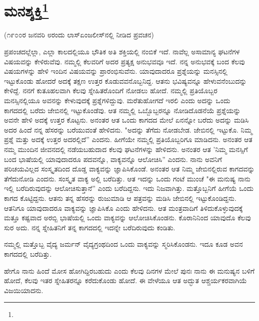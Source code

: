 
\chapter[ಮನಶ್ಶಕ್ತಿ]{ಮನಶ್ಶಕ್ತಿ\protect\footnote{}}

\begin{center}
(೧೯೦೦ರ ಜನವರಿ ೮ರಂದು ಲಾಸ್‌ಏಂಜಲೀಸ್‌ನಲ್ಲಿ ನೀಡಿದ ಪ್ರವಚನ)
\end{center}

ಪ್ರಪಂಚದಲ್ಲೆಲ್ಲಾ, ಎಲ್ಲಾ ಕಾಲದಲ್ಲಿಯೂ ಭೌತಿಕ ಅತಿ ಶಕ್ತಿಯಲ್ಲಿ ನಂಬಿಕೆ ಇದೆ. ನಾವೆಲ್ಲ ಅಸಾಮಾನ್ಯ ಘಟನೆಗಳ ವಿಷಯವನ್ನು ಕೇಳಿರುವೆವು. ನಮ್ಮಲ್ಲಿ ಕೆಲವರಿಗೆ ಅದರ ಪ್ರತ್ಯಕ್ಷ ಅನುಭವವೂ ಇದೆ. ನನ್ನ ಅನುಭವಕ್ಕೆ ಬಂದ ಕೆಲವು ವಿಷಯಗಳನ್ನು ಹೇಳಿ ಇಂದಿನ ವಿಷಯವನ್ನು ಪ್ರಾರಂಭಿಸುವೆನು. ಯಾವುದಾದರೂ ಪ್ರಶ್ನೆಯನ್ನು ಮನಸ್ಸಿನಲ್ಲಿ ಇಟ್ಟುಕೊಂಡು ಹೋದರೆ ಅದಕ್ಕೆ ತಕ್ಷಣ ಉತ್ತರ ಕೊಡುವವನೊಬ್ಬನಿದ್ದ. ಆತನು ಭವಿಷ್ಯವನ್ನೂ ಹೇಳುವನೆಂಬುದನ್ನು ಕೇಳಿದ್ದೆ. ನನಗೆ ಕುತೂಹಲವಾಗಿ ಕೆಲವು ಸ್ನೇಹಿತರೊಂದಿಗೆ ನೋಡಲು ಹೋದೆ. ನಮ್ಮಲ್ಲಿ ಪ್ರತಿಯೊಬ್ಬರ ಮನಸ್ಸಿನಲ್ಲಿಯೂ ಅವನನ್ನು ಕೇಳುವುದಕ್ಕೆ ಪ್ರಶ್ನೆಗಳಿದ್ದುವು. ಮರೆತುಹೋಗದೆ ಇರಲಿ ಎಂದು ಅದನ್ನು ಒಂದು ಕಾಗದದಲ್ಲಿ ಬರೆದು ಜೇಬಿನಲ್ಲಿ ಇಟ್ಟುಕೊಂಡೆವು. ಆತ ನಮ್ಮಲ್ಲಿ ಒಬ್ಬೊಬ್ಬರನ್ನೂ ನೋಡಿದೊಡನೆಯೆ ಪ್ರಶ್ನೆಯನ್ನು ಅವನೇ ಹೇಳಿ ಅದಕ್ಕೆ ಉತ್ತರ ಕೊಟ್ಟನು. ಅನಂತರ ಆತ ಒಂದು ಕಾಗದದ ಮೇಲೆ ಏನನ್ನೋ ಬರೆದು ಅದನ್ನು ಮಡಿಸಿ ಅದರ ಹಿಂದೆ ನನ್ನ ಹೆಸರನ್ನು ಬರೆಯುವಂತೆ ಹೇಳಿದನು. "ಅದನ್ನು ತೆಗೆದು ನೋಡಬೇಡ. ಜೇಬಿನಲ್ಲಿ ಇಟ್ಟುಕೊ. ನಿಮ್ಮ ಪ್ರಶ್ನೆ ಮತ್ತು ಅದಕ್ಕೆ ಉತ್ತರ ಅದರಲ್ಲಿದೆ'' ಎಂದನು. ಹೀಗೆಯೇ ನಮ್ಮಲ್ಲಿ ಪ್ರತಿಯೊಬ್ಬರಿಗೂ ಮಾಡಿದನು. ಅನಂತರ ಆತ ನಮ್ಮ ಮುಂದಿನ ಜೀವನದಲ್ಲಿ ನಡೆಯಬಹುದಾದ ಕೆಲವು ಘಟನೆಗಳನ್ನು ಹೇಳಿದನು. ಅನಂತರ ಆತ 'ನಿಮ್ಮ ಮನಸ್ಸಿಗೆ ಬಂದ ಭಾಷೆಯಲ್ಲಿ ಯಾವುದಾದರೂ ಪದವನ್ನೊ, ವಾಕ್ಯವನ್ನೊ ಆಲೋಚಿಸಿ'' ಎಂದನು. ನಾನು ಅವನಿಗೆ ಪರಿಚಯವಿಲ್ಲದ ಸಂಸ್ಕೃತದಿಂದ ದೊಡ್ಡ ವಾಕ್ಯವನ್ನು ಜ್ಞಾಪಿಸಿಕೊಂಡೆ. ಅನಂತರ ಆತ ನಿಮ್ಮ ಜೇಬಿನಲ್ಲಿರುವ ಕಾಗದವನ್ನು ತೆಗೆದುನೋಡಿ ಎಂದನು. ಸಂಸ್ಕೃತ ವಾಕ್ಯ ಅಲ್ಲಿ ಬರೆದಿತ್ತು. ಆತ ಇದನ್ನು ಒಂದು ಗಂಟೆ ಮುಂಚೆ "ಈ ಮನುಷ್ಯ ನಾನು ಇಲ್ಲಿ ಬರೆದಿರುವುದನ್ನು ಆಲೋಚಿಸುತ್ತಾನೆ'' ಎಂದು ಬರೆದಿದ್ದನು. ಇದು ನಿಜವಾಗಿತ್ತು. ಮತ್ತೊಬ್ಬನಿಗೆ ಹೀಗೆಯೆ ಒಂದು ಕಾಗದ ಕೊಟ್ಟಿದ್ದನು. ಆತನು ತನ್ನ ಹೆಸರನ್ನು ರುಜುಮಾಡಿ ಆ ಪತ್ರವನ್ನು ಮಡಿಸಿ ಜೇಬಿನಲ್ಲಿ ಇಟ್ಟುಕೊಂಡಿದ್ದನು. ಆತನಿಗೂ ಯಾವುದಾದರೂ ವಾಕ್ಯವನ್ನು ಜ್ಞಾಪಿಸಿಕೊ ಎಂದು ಹೇಳಿದನು. ಆತ ಮಂತ್ರವಾದಿಗೆ ತಿಳಿದುಕೊಳ್ಳುವುದಕ್ಕೆ ಮತ್ತೂ ಕಷ್ಟವಾದ ಅರಬ್ಬಿ ಭಾಷೆಯಲ್ಲಿ ಒಂದು ವಾಕ್ಯವನ್ನು ಆಲೋಚಿಸಿಕೊಂಡನು. ಕೊರಾನಿನಿಂದ ಯಾವುದೊ ಕೆಲವು ಸುರ ಅದು. ನನ್ನ ಸ್ನೇಹಿತನಿಗೆ ತನ್ನ ಕಾಗದದಲ್ಲಿ ಇದನ್ನೇ ಬರೆದಿರುವುದು ಕಂಡಿತು.

ನಮ್ಮಲ್ಲಿ ಮತ್ತೊಬ್ಬ ವೈದ್ಯ ಜರ್ಮನ್ ವೈದ್ಯಗ್ರಂಥದಿಂದ ಒಂದು ವಾಕ್ಯವನ್ನು ಸ್ಮರಿಸಿಕೊಂಡನು. ಇದೂ ಕೂಡ ಅವನ ಕಾಗದದಲ್ಲಿ ಬರೆದಿತ್ತು.

ಹೇಗೊ ನಾನು ಹಿಂದೆ ಮೋಸ ಹೋಗಿದ್ದಿರಬಹುದು ಎಂದು ಕೆಲವು ದಿನಗಳ ಮೇಲೆ ಪುನಃ ನಾನು ಈ ಮನುಷ್ಯನ ಬಳಿಗೆ ಹೋದೆ, ಕೆಲವು ಇತರ ಸ್ನೇಹಿತರನ್ನೂ ಕರೆದುಕೊಂಡು ಹೋದೆ. ಈ ವೇಳೆಯೂ ಆತ ಅದ್ಭುತ ಆಶ್ಚರ್ಯಕರವಾಗಿಯೆ ವಿಜಯಿಯಾದನು.

